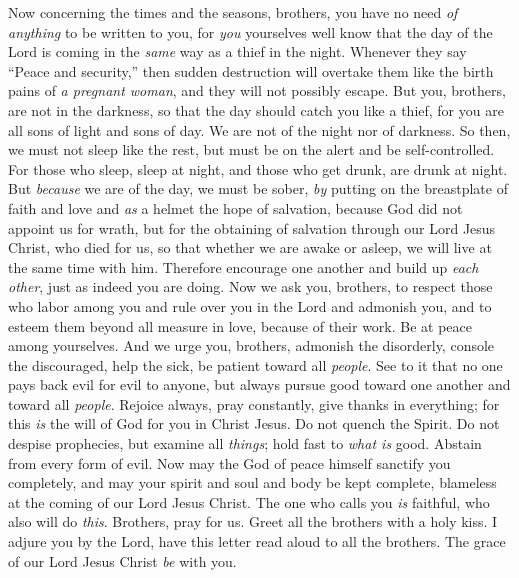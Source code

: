 \begin{biblechapter} %
 Now concerning the times and the seasons, brothers, you have no need \textit{of anything} to be written to you,
\verse for \textit{you} yourselves well know that the day of the Lord is coming in the \textit{same} way as a thief in the night.
\verse Whenever they say “Peace and security,” then sudden destruction will overtake them like the birth pains of \textit{a pregnant woman}, and they will not possibly escape.
\verse But you, brothers, are not in the darkness, so that the day should catch you like a thief,
\verse for you are all sons of light and sons of day. We are not of the night nor of darkness.
\verse So then, we must not sleep like the rest, but must be on the alert and be self-controlled.
\verse For those who sleep, sleep at night, and those who get drunk, are drunk at night.
\verse But \textit{because} we are of the day, we must be sober, \textit{by} putting on the breastplate of faith and love and \textit{as} a helmet the hope of salvation,
\verse because God did not appoint us for wrath, but for the obtaining of salvation through our Lord Jesus Christ,
\verse who died for us, so that whether we are awake or asleep, we will live at the same time with him.
\verse Therefore encourage one another and build up \textit{each other}, just as indeed you are doing.
 Now we ask you, brothers, to respect those who labor among you and rule over you in the Lord and admonish you,
\verse and to esteem them beyond all measure in love, because of their work. Be at peace among yourselves.
\verse And we urge you, brothers, admonish the disorderly, console the discouraged, help the sick, be patient toward all \textit{people}.
\verse See to it that no one pays back evil for evil to anyone, but always pursue good toward one another and toward all \textit{people}.
\verse Rejoice always,
\verse pray constantly,
\verse give thanks in everything; for this \textit{is} the will of God for you in Christ Jesus.
\verse Do not quench the Spirit.
\verse Do not despise prophecies,
\verse but examine all \textit{things}; hold fast to \textit{what is} good.
\verse Abstain from every form of evil.
\verse Now may the God of peace himself sanctify you completely, and may your spirit and soul and body be kept complete, blameless at the coming of our Lord Jesus Christ.
\verse The one who calls you \textit{is} faithful, who also will do \textit{this}.
\verse Brothers, pray for us.
\verse Greet all the brothers with a holy kiss.
\verse I adjure you by the Lord, have this letter read aloud to all the brothers.
\verse The grace of our Lord Jesus Christ \textit{be} with you.
\end{biblechapter}

